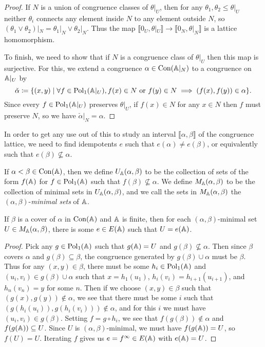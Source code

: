 \begin{appendices}
\begin{proof}
If $N$ is a union of congruence classes of $\theta|_U$, then for any $\theta_1, \theta_2 \le \theta|_U$ neither $\theta_i$ connects any element inside $N$ to any element outside $N$, so $(\theta_1 \vee \theta_2)|_N = \theta_1|_N \vee \theta_2|_N$. Thus the map $\llbracket 0_U, \theta|_U \rrbracket \rightarrow \llbracket 0_N, \theta|_N \rrbracket$ is a lattice homomorphism.

To finish, we need to show that if $N$ is a congruence class of $\theta|_U$ then this map is surjective. For this, we extend a congruence $\alpha \in \operatorname{Con}(\mathbb{A}|_N)$ to a congruence on $\mathbb{A}|_U$ by
\[
\check{\alpha} \coloneqq \{(x,y) \mid \forall f \in \operatorname{Pol}_1(\mathbb{A}|_U), f(x) \in N\text{ or }f(y)\in N \implies (f(x),f(y)) \in \alpha\}.
\]
Since every $f \in \operatorname{Pol}_1(\mathbb{A}|_U)$ preserves $\theta|_U$, if $f(x) \in N$ for any $x \in N$ then $f$ must preserve $N$, so we have $\check{\alpha}|_N = \alpha$.
\end{proof}

In order to get any use out of this to study an interval $\llbracket \alpha, \beta \rrbracket$ of the congruence lattice, we need to find idempotents $e$ such that $e(\alpha) \ne e(\beta)$, or equivalently such that $e(\beta) \not\subseteq \alpha$.

\begin{defn} If $\alpha < \beta \in \operatorname{Con}(\mathbb{A})$, then we define $U_{\mathbb{A}}(\alpha, \beta)$ to be the collection of sets of the form $f(\mathbb{A})$ for $f \in \operatorname{Pol}_1(\mathbb{A})$ such that $f(\beta) \not\subseteq \alpha$. We define $M_{\mathbb{A}}(\alpha, \beta)$ to be the collection of minimal sets in $U_{\mathbb{A}}(\alpha, \beta)$, and we call the sets in $M_{\mathbb{A}}(\alpha, \beta)$ the $(\alpha, \beta)$-\emph{minimal sets} of $\mathbb{A}$.
\end{defn}

\begin{prop} If $\beta$ is a cover of $\alpha$ in $\operatorname{Con}(\mathbb{A})$ and $\mathbb{A}$ is finite, then for each $(\alpha,\beta)$-minimal set $U \in M_{\mathbb{A}}(\alpha,\beta)$, there is some $e \in E(\mathbb{A})$ such that $U = e(\mathbb{A})$.
\end{prop}
\begin{proof} Pick any $g \in \operatorname{Pol}_1(\mathbb{A})$ such that $g(\mathbb{A}) = U$ and $g(\beta) \not\subseteq \alpha$. Then since $\beta$ covers $\alpha$ and $g(\beta) \subseteq \beta$, the congruence generated by $g(\beta) \cup \alpha$ must be $\beta$. Thus for any $(x,y) \in \beta$, there must be some $h_i \in \operatorname{Pol}_1(\mathbb{A})$ and $(u_i,v_i) \in g(\beta) \cup \alpha$ such that $x = h_1(u_1)$, $h_i(v_i) = h_{i+1}(u_{i+1})$, and $h_n(v_n) = y$ for some $n$. Then if we choose $(x,y) \in \beta$ such that $(g(x),g(y)) \not\in \alpha$, we see that there must be some $i$ such that $(g(h_i(u_i)), g(h_i(v_i))) \not\in \alpha$, and for this $i$ we must have $(u_i,v_i) \in g(\beta)$. Setting $f = g\circ h_i$, we see that $f(g(\beta)) \not\in \alpha$ and $f(g(\mathbb{A})) \subseteq U$. Since $U$ is $(\alpha,\beta)$-minimal, we must have $f(g(\mathbb{A})) = U$, so $f(U) = U$. Iterating $f$ gives us $e = f^{\infty} \in E(\mathbb{A})$ with $e(\mathbb{A}) = U$.
\end{proof}


\end{appendices}
